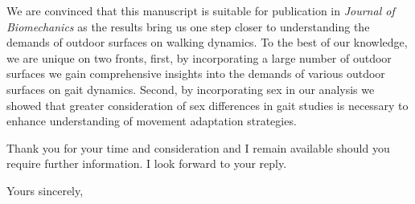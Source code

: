 \documentclass{letter}
\begin{document}
\begin{letter}{}
We are convinced that this manuscript is suitable for publication in \textit{Journal of Biomechanics} as the results bring us one step closer to understanding the demands of outdoor surfaces on walking dynamics. To the best of our knowledge, we are unique on two fronts, first, by incorporating a large number of outdoor surfaces we gain comprehensive insights into the demands of various outdoor surfaces on gait dynamics. Second, by incorporating sex in our analysis we showed that greater consideration of sex differences in gait studies is necessary to enhance understanding of movement adaptation strategies.

Thank you for your time and consideration and I remain available should you require further information. I look forward to your reply.

\closing{Yours sincerely,}

\end{letter}
\end{document}
